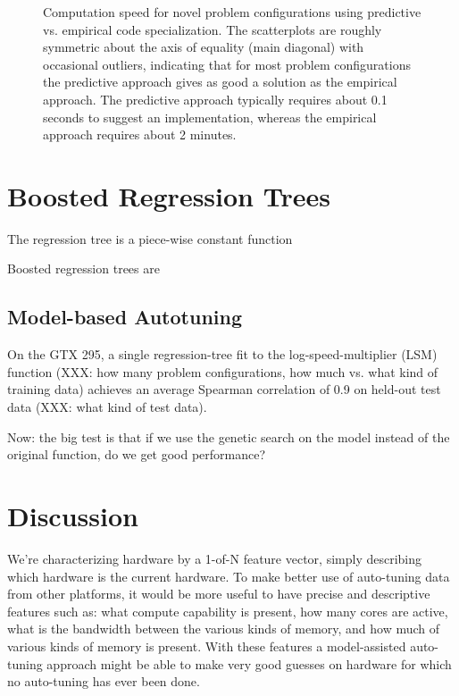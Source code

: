 \documentclass{sig-alternate}
\begin{document}
\begin{figure}
\caption{Computation speed for novel problem configurations using predictive
vs. empirical code specialization.
The scatterplots are roughly symmetric about the axis of equality (main diagonal)
with occasional outliers, indicating that for most problem configurations the
predictive approach gives as good a solution as the empirical approach.
The predictive approach typically requires about 0.1 seconds to suggest an
implementation, whereas the empirical approach requires about 2 minutes.
}
\label{fig:fig_gflop_scatter}
\end{figure}


\section{Boosted Regression Trees}

The regression tree is a piece-wise constant function 

Boosted regression trees are

\subsection{Model-based Autotuning}

On the GTX 295, a single regression-tree fit to the log-speed-multiplier
(LSM) function (XXX: how many problem configurations, how much vs. what
kind of training data) achieves an average Spearman correlation of 0.9 on
held-out test data (XXX: what kind of test data).

Now: the big test is that if we use the genetic search on the model instead of
the original function, do we get good performance?

\section{Discussion}

We're characterizing hardware by a 1-of-N feature vector, simply describing
which hardware is the current hardware.
To make better use of auto-tuning data from other platforms, it would be more
useful to have precise and descriptive features such as: what compute
capability is present, how many cores are active, what is the bandwidth
between the various kinds of memory, and how much of various kinds of memory
is present.  With these features a model-assisted auto-tuning approach
might be able to make very good guesses on hardware for which no auto-tuning
has ever been done.
\end{document}
